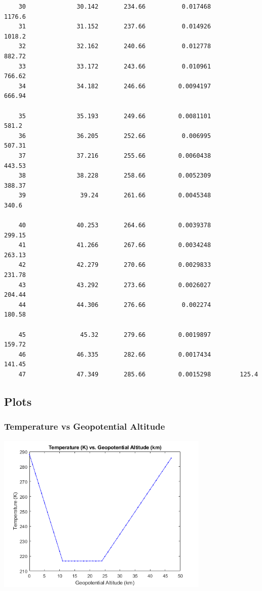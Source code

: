 \documentclass{article}
\begin{document}
\begin{verbatim}
    30              30.142       234.66          0.017468        1176.6
    31              31.152       237.66          0.014926        1018.2
    32              32.162       240.66          0.012778        882.72
    33              33.172       243.66          0.010961        766.62
    34              34.182       246.66         0.0094197        666.94
    
    35              35.193       249.66         0.0081101         581.2
    36              36.205       252.66          0.006995        507.31
    37              37.216       255.66         0.0060438        443.53
    38              38.228       258.66         0.0052309        388.37
    39               39.24       261.66         0.0045348         340.6
    
    40              40.253       264.66         0.0039378        299.15
    41              41.266       267.66         0.0034248        263.13
    42              42.279       270.66         0.0029833        231.78
    43              43.292       273.66         0.0026027        204.44
    44              44.306       276.66          0.002274        180.58
    
    45               45.32       279.66         0.0019897        159.72
    46              46.335       282.66         0.0017434        141.45
    47              47.349       285.66         0.0015298        125.4
\end{verbatim}
\subsection{Plots}
\subsubsection{Temperature vs Geopotential Altitude}
\includegraphics [height=3in]{graph1.png}
\end{document}
